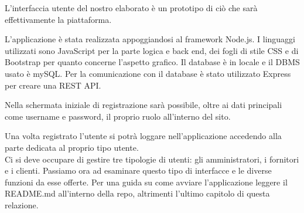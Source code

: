 L'interfaccia utente del nostro elaborato è un prototipo di ciò che sarà effettivamente la piattaforma.\\
\begin{center}
\end{center}
L'applicazione è stata realizzata appoggiandosi al framework Node.js. 
I linguaggi utilizzati sono JavaScript per la parte logica e back end, dei fogli di stile CSS e di Bootstrap per quanto concerne l'aspetto grafico. 
Il database è in locale e il DBMS usato è mySQL.
Per la comunicazione con il database è stato utilizzato Express per creare una REST API.\\
\begin{center}
\end{center}
Nella schermata iniziale di registrazione sarà possibile, oltre ai dati principali come username e password, il proprio ruolo all'interno del sito.\\
\begin{center}
\end{center}
Una volta registrato l'utente si potrà loggare nell'applicazione accedendo alla parte dedicata al proprio tipo utente.\\
\vfill
Ci si deve occupare di gestire tre tipologie di utenti: gli amministratori, i fornitori e i clienti.
Passiamo ora ad esaminare questo tipo di interfacce e le diverse funzioni da esse offerte.
\vfill
Per una guida su come avviare l'applicazione leggere il README.md all'interno della repo, altrimenti l'ultimo capitolo di questa relazione.
